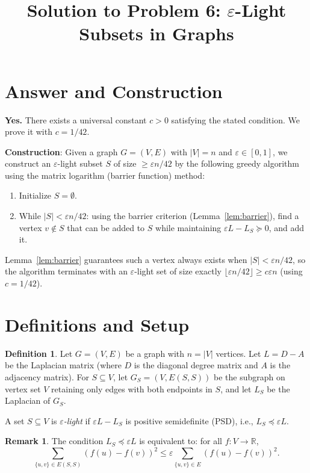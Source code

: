 \documentclass[12pt]{article}
\title{Solution to Problem 6: $\varepsilon$-Light Subsets in Graphs}
\author{}
\date{}
\theoremstyle{definition}
\newtheorem{definition}{Definition}
\newtheorem{remark}{Remark}
\begin{document}
\maketitle

\section*{Answer and Construction}

\textbf{Yes.} There exists a universal constant $c > 0$ satisfying the stated condition. We prove it with $c = 1/42$.

\textbf{Construction}: Given a graph $G = (V, E)$ with $|V| = n$ and $\varepsilon \in [0,1]$, we construct an $\varepsilon$-light subset $S$ of size $\geq \varepsilon n/42$ by the following greedy algorithm using the matrix logarithm (barrier function) method:
\begin{enumerate}
\item Initialize $S = \emptyset$.
\item While $|S| < \varepsilon n / 42$: using the barrier criterion (Lemma~\ref{lem:barrier}), find a vertex $v \notin S$ that can be added to $S$ while maintaining $\varepsilon L - L_S \succeq 0$, and add it.
\end{enumerate}
Lemma~\ref{lem:barrier} guarantees such a vertex always exists when $|S| < \varepsilon n/42$, so the algorithm terminates with an $\varepsilon$-light set of size exactly $\lfloor \varepsilon n / 42 \rfloor \geq c\varepsilon n$ (using $c = 1/42$).

\section{Definitions and Setup}

\begin{definition}
Let $G = (V,E)$ be a graph with $n = |V|$ vertices. Let $L = D - A$ be the Laplacian matrix (where $D$ is the diagonal degree matrix and $A$ is the adjacency matrix). For $S \subseteq V$, let $G_S = (V, E(S,S))$ be the subgraph on vertex set $V$ retaining only edges with both endpoints in $S$, and let $L_S$ be the Laplacian of $G_S$.

A set $S \subseteq V$ is \emph{$\varepsilon$-light} if $\varepsilon L - L_S$ is positive semidefinite (PSD), i.e., $L_S \preceq \varepsilon L$.
\end{definition}

\begin{remark}
The condition $L_S \preceq \varepsilon L$ is equivalent to: for all $f : V \to \mathbb{R}$,
$$\sum_{\{u,v\} \in E(S,S)} (f(u)-f(v))^2 \leq \varepsilon \sum_{\{u,v\}\in E} (f(u)-f(v))^2.$$
\end{remark}
\end{document}
